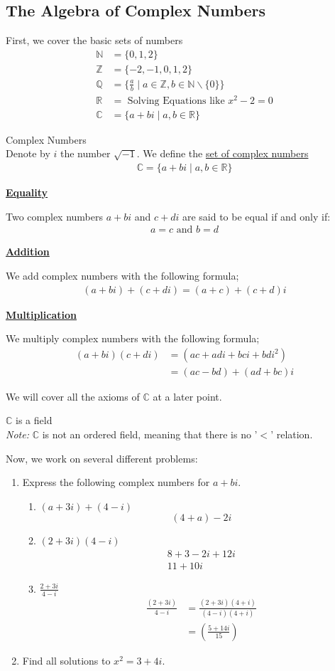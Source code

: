 \documentclass[10pt]{paper}
\newcommand{\Z}{\mathbb{Z}}\newcommand{\R}{\mathbb{R}}\newcommand{\N}{\mathbb{N}}\newcommand{\Q}{\mathbb{Q}}\newcommand{\C}{\mathbb{C}}
\newcommand{\gspc}{\vspace{0.13cm}} %
\newcommand{\gline}[0]{\gspc\\} %
\newcommand{\centerit}[1]{{\begin{center} #1 \end{center}}}
\newcommand{\ul}[1]{\underline{#1}}
\begin{document}
\subsection{The Algebra of Complex Numbers}
First, we cover the basic sets of numbers
\begin{align*}
  \N &= \{0, 1, 2\}\\
  \Z &= \{-2, -1, 0, 1, 2\}\\
  \Q &= \{\frac{a}b \mid a\in \Z, b\in \N \backslash\{0\}\}\\
  \R &= \text{ Solving Equations like } x^2 - 2 = 0\\
  \C &= \{a+bi\mid a,b\in\R\}
\end{align*}
\begin{definition}{Complex Numbers}{}\gline{}
  Denote by $i$ the number $\sqrt{-1}$. We define the \ul{set of complex numbers}
  \begin{align*}
    \C =\{a+bi\mid a,b\in\R\}
  \end{align*}
  \centerit{\ul{\textbf{Equality}}}
  Two complex numbers $a+bi$ and $c+di$ are said to be equal if and only if:
  \begin{align*}
    a = c \text{ and } b = d
  \end{align*}
  \centerit{\ul{\textbf{Addition}}}
  We add complex numbers with the following formula;
  \begin{gather*}
    (a+bi) + (c + di) = (a+c) + (c + d)i
  \end{gather*}
  \centerit{\ul{\textbf{Multiplication}}}
  We multiply complex numbers with the following formula;
  \begin{align*}
    (a+bi)(c+di)&= (ac + adi + bci + bdi^2)\\
    &= (ac-bd) + (ad+bc)i
  \end{align*}
\end{definition}
We will cover all the axioms of $\C$ at a later point. 
\begin{theorem}{$\C$ is a field}{}\gline{}
  \textit{Note: }$\C$ is not an ordered field, meaning that there is no '$<$' relation.
\end{theorem}
Now, we work on several different problems:
\begin{enumerate}
  \item Express the following complex numbers for $a+ bi$.
  \begin{enumerate}
    \item $(a+3i)+(4-i)$
    \[(4 + a)-2i\]
    \item $(2+3i)(4-i)$
    \begin{gather*}
      8 + 3 - 2i + 12 i\\
      11 + 10i
    \end{gather*}
    \item $\displaystyle\frac{2+3i}{4-i}$
    \begin{align*}
      \frac{(2+3i)}{4-i}&= \frac{(2+3i)(4+i)}{(4-i)(4+i)}\\
      &= \left(\frac{5 + 14i}{15}\right)
    \end{align*}
  \end{enumerate}
  \item Find all solutions to $x^2 = 3 + 4i$. 
\end{enumerate}
\end{document}
